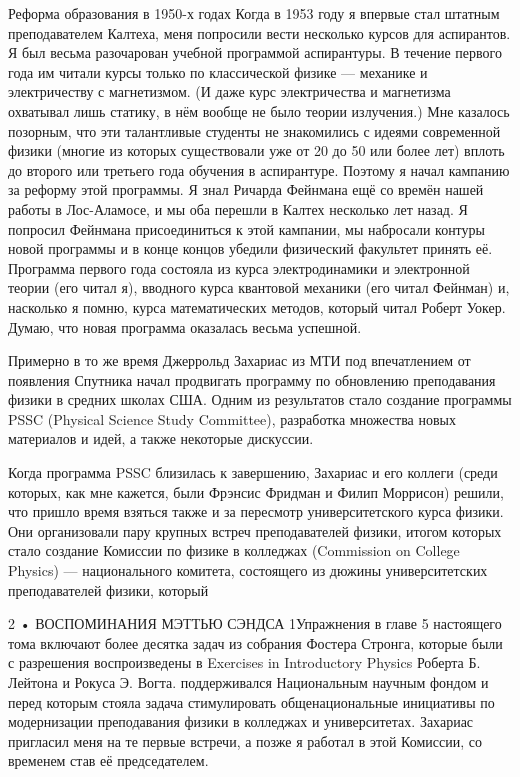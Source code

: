 \documentclass[10pt,oneside]{article}
\begin{document}
Реформа образования в 1950-х годах Когда в 1953 году я впервые стал штатным преподавателем Калтеха, меня попросили вести несколько курсов для аспирантов. Я был весьма разочарован учебной программой аспирантуры. В течение первого года им читали курсы только по классической физике --- механике и электричеству с магнетизмом. (И даже курс электричества и магнетизма охватывал лишь статику, в нём вообще не было теории излучения.) Мне казалось позорным, что эти талантливые студенты не знакомились с идеями современной физики (многие из которых существовали уже от 20 до 50 или более лет) вплоть до второго или третьего года обучения в аспирантуре. Поэтому я начал кампанию за реформу этой программы. Я знал Ричарда Фейнмана ещё со времён нашей работы в Лос-Аламосе, и мы оба перешли в Калтех несколько лет назад. Я попросил Фейнмана присоединиться к этой кампании, мы набросали контуры новой программы и в конце концов убедили физический факультет принять её. Программа первого года состояла из курса электродинамики и электронной теории (его читал я), вводного курса квантовой механики (его читал Фейнман) и, насколько я помню, курса математических методов, который читал Роберт Уокер. Думаю, что новая программа оказалась весьма успешной.\par

Примерно в то же время Джеррольд Захариас из МТИ под впечатлением от появления Спутника начал продвигать программу по обновлению преподавания физики в средних школах США. Одним из результатов стало создание программы PSSC (Physical Science Study Committee), разработка множества новых материалов и идей, а также некоторые дискуссии.\par

Когда программа PSSC близилась к завершению, Захариас и его коллеги (среди которых, как мне кажется, были Фрэнсис Фридман и Филип Моррисон) решили, что пришло время взяться также и за пересмотр университетского курса физики. Они организовали пару крупных встреч преподавателей физики, итогом которых стало создание Комиссии по физике в колледжах (Commission on College Physics) --- национального комитета, состоящего из дюжины университетских преподавателей физики, который\par

2 • ВОСПОМИНАНИЯ МЭТТЬЮ СЭНДСА 1Упражнения в главе 5 настоящего тома включают более десятка задач из собрания Фостера Стронга, которые были с разрешения воспроизведены в Exercises in Introductory Physics Роберта Б. Лейтона и Рокуса Э. Вогта. поддерживался Национальным научным фондом и перед которым стояла задача стимулировать общенациональные инициативы по модернизации преподавания физики в колледжах и университетах. Захариас пригласил меня на те первые встречи, а позже я работал в этой Комиссии, со временем став её председателем.\par
\end{document}
